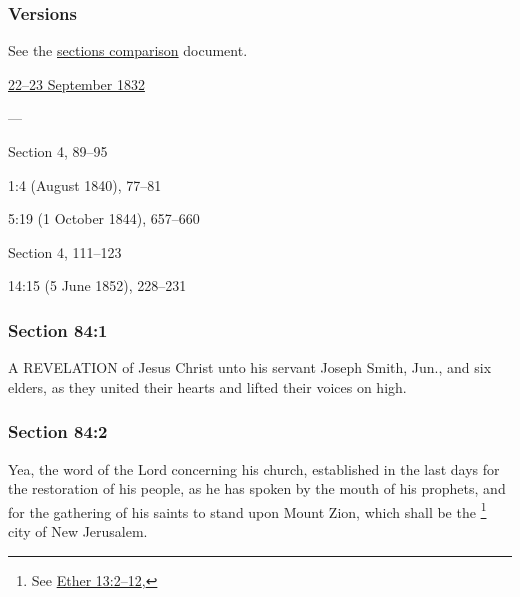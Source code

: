 	\subsubsection{Versions}
		\label{DC84-V}
		
		See the \href{https://drive.google.com/file/d/1goAvNz8jS4R8slYfMG_db55Ty2z_vmgK/view?usp=sharing}{sections comparison} document.
	
		\begin{compactdesc}
			\item[JSP] \hyperref[EMS-1832-JS-22-23-SEP-1832]{22--23 September 1832}
			\item[BC] ---
			\item[DC 1835] Section 4, 89--95
			\item[MS] 1:4 (August 1840), 77--81
			\item[TS] 5:19 (1 October 1844), 657--660
			\item[DC 1844] Section 4, 111--123
			\item[MS] 14:15 (5 June 1852), 228--231
		\end{compactdesc}

	\subsubsection{Section 84:1} %
		\label{DC84-1}

		A REVELATION of Jesus Christ unto his servant Joseph Smith, Jun., and six elders, as they united their hearts and lifted their voices on high.


	\subsubsection{Section 84:2} %
		\label{DC84-2}

		Yea, the word of the Lord concerning his church, established in the last days for the restoration of his people, as he has spoken by the mouth of his prophets, and for the gathering of his saints to stand upon Mount Zion, which shall be the
			\footnote{%
				See \hyperref[ETHER-13-2]{Ether 13:2--12},
				}%
		city of New Jerusalem.

